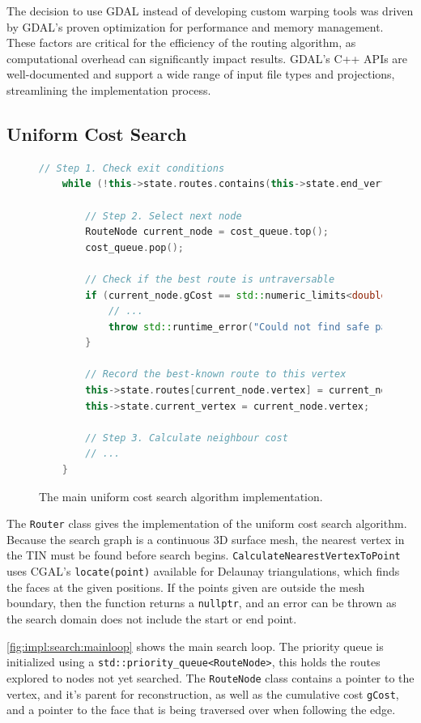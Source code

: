 \documentclass[12pt]{article}
\begin{document}
The decision to use GDAL instead of developing custom warping tools was driven by GDAL's proven optimization for performance and memory management. These factors are critical for the efficiency of the routing algorithm, as computational overhead can significantly impact results. GDAL's C++ APIs are well-documented and support a wide range of input file types and projections, streamlining the implementation process.

\subsection{Uniform Cost Search}

\begin{figure}[H]
  \centering
  \begin{lstlisting}[language=c++]
	// Step 1. Check exit conditions
	while (!this->state.routes.contains(this->state.end_vertex)) {

		// Step 2. Select next node
		RouteNode current_node = cost_queue.top();
		cost_queue.pop();
		
		// Check if the best route is untraversable
		if (current_node.gCost == std::numeric_limits<double>::infinity()) {
			// ...
			throw std::runtime_error("Could not find safe path");
		}

		// Record the best-known route to this vertex
		this->state.routes[current_node.vertex] = current_node;
		this->state.current_vertex = current_node.vertex;

		// Step 3. Calculate neighbour cost
		// ...
	}
	\end{lstlisting}
  \vspace{-2em}
  \caption{The main uniform cost search algorithm implementation.}
  \label{fig:impl:search:mainloop}
\end{figure}

The \texttt{Router} class gives the implementation of the uniform cost search algorithm. Because the search graph is a continuous 3D surface mesh, the nearest vertex in the TIN must be found before search begins. \texttt{CalculateNearestVertexToPoint} uses CGAL's \texttt{locate(point)} available for Delaunay triangulations, which finds the faces at the given positions. If the points given are outside the mesh boundary, then the function returns a \texttt{nullptr}, and an error can be thrown as the search domain does not include the start or end point.

\autoref{fig:impl:search:mainloop} shows the main search loop. The priority queue is initialized using a \texttt{std::priority\_queue<RouteNode>}, this holds the routes explored to nodes not yet searched. The \texttt{RouteNode} class contains a pointer to the vertex, and it's parent for reconstruction, as well as the cumulative cost \texttt{gCost}, and a pointer to the face that is being traversed over when following the edge.
\end{document}
